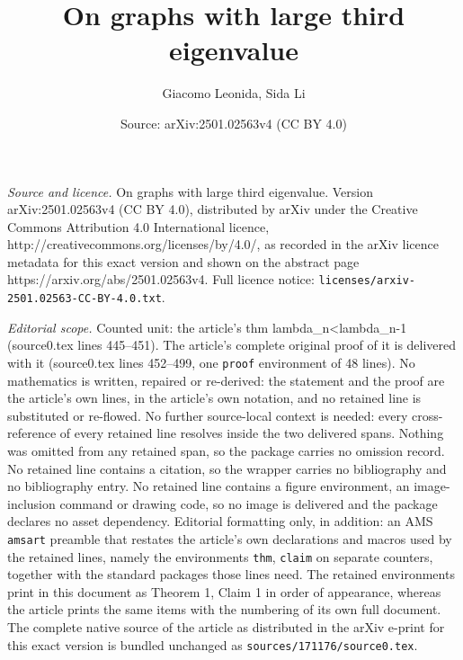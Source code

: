 \documentclass[10pt,a4paper]{amsart}
\title{On graphs with large third eigenvalue}
\author{Giacomo Leonida, Sida Li}
\date{Source: arXiv:2501.02563v4 (CC BY 4.0)}
\begin{document}
\maketitle

\noindent\emph{Source and licence.} On graphs with large third eigenvalue. Version arXiv:2501.02563v4 (CC BY 4.0), distributed by arXiv under the Creative Commons Attribution 4.0 International licence, http://creativecommons.org/licenses/by/4.0/, as recorded in the arXiv licence metadata for this exact version and shown on the abstract page https://arxiv.org/abs/2501.02563v4. Full licence notice: \texttt{licenses/arxiv-2501.02563-CC-BY-4.0.txt}.\par\smallskip

\noindent\textit{Editorial scope.} Counted unit: the article's thm lambda\_n<lambda\_n-1 (source0.tex lines 445--451). The article's complete original proof of it is delivered with it (source0.tex lines 452--499, one \texttt{proof} environment of 48 lines). No mathematics is written, repaired or re-derived: the statement and the proof are the article's own lines, in the article's own notation, and no retained line is substituted or re-flowed.  No further source-local context is needed: every cross-reference of every retained line resolves inside the two delivered spans.  Nothing was omitted from any retained span, so the package carries no omission record.  No retained line contains a citation, so the wrapper carries no bibliography and no bibliography entry.  No retained line contains a figure environment, an image-inclusion command or drawing code, so no image is delivered and the package declares no asset dependency.  Editorial formatting only, in addition: an AMS \texttt{amsart} preamble that restates the article's own declarations and macros used by the retained lines, namely the environments \texttt{thm}, \texttt{claim} on separate counters, together with the standard packages those lines need.  The retained environments print in this document as Theorem 1, Claim 1 in order of appearance, whereas the article prints the same items with the numbering of its own full document.  The complete native source of the article as distributed in the arXiv e-print for this exact version is bundled unchanged as \texttt{sources/171176/source0.tex}.
\end{document}
